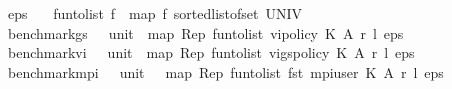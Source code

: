 \begin{isabellebody}
\isamarkupfalse%
\ {\isachardoublequoteopen}eps\ {\isacharequal}{\kern0pt}\ {}{\isachardot}{\kern0pt}{}{\isachardoublequoteclose}\isanewline
\isanewline
{}\isamarkupfalse%
\ {\isachardoublequoteopen}fun{\isacharunderscore}{\kern0pt}to{\isacharunderscore}{\kern0pt}list\ f\ {\isacharequal}{\kern0pt}\ map\ f\ {\isacharparenleft}{\kern0pt}sorted{\isacharunderscore}{\kern0pt}list{\isacharunderscore}{\kern0pt}of{\isacharunderscore}{\kern0pt}set\ UNIV{\isacharparenright}{\kern0pt}{\isachardoublequoteclose}\isanewline
{}\isamarkupfalse%
\ {\isachardoublequoteopen}benchmark{\isacharunderscore}{\kern0pt}gs\ {\isacharparenleft}{\kern0pt}{\isacharunderscore}{\kern0pt}\ {\isacharcolon}{\kern0pt}{\isacharcolon}{\kern0pt}\ unit{\isacharparenright}{\kern0pt}\ {\isacharequal}{\kern0pt}\ map\ Rep\ {\isacharparenleft}{\kern0pt}fun{\isacharunderscore}{\kern0pt}to{\isacharunderscore}{\kern0pt}list\ {\isacharparenleft}{\kern0pt}vi{\isacharunderscore}{\kern0pt}policy{\isacharprime}{\kern0pt}\ K\ A\ r\ l\ eps\ {}{\isacharparenright}{\kern0pt}{\isacharparenright}{\kern0pt}{\isachardoublequoteclose}\isanewline
{}\isamarkupfalse%
\ {\isachardoublequoteopen}benchmark{\isacharunderscore}{\kern0pt}vi\ {\isacharparenleft}{\kern0pt}{\isacharunderscore}{\kern0pt}\ {\isacharcolon}{\kern0pt}{\isacharcolon}{\kern0pt}\ unit{\isacharparenright}{\kern0pt}\ {\isacharequal}{\kern0pt}\ map\ Rep\ {\isacharparenleft}{\kern0pt}fun{\isacharunderscore}{\kern0pt}to{\isacharunderscore}{\kern0pt}list\ {\isacharparenleft}{\kern0pt}vi{\isacharunderscore}{\kern0pt}gs{\isacharunderscore}{\kern0pt}policy\ K\ A\ r\ l\ eps\ {}{\isacharparenright}{\kern0pt}{\isacharparenright}{\kern0pt}{\isachardoublequoteclose}\isanewline
{}\isamarkupfalse%
\ {\isachardoublequoteopen}benchmark{\isacharunderscore}{\kern0pt}mpi\ {\isacharparenleft}{\kern0pt}{\isacharunderscore}{\kern0pt}\ {\isacharcolon}{\kern0pt}{\isacharcolon}{\kern0pt}\ unit\ {\isacharparenright}{\kern0pt}\ {\isacharequal}{\kern0pt}\ map\ Rep\ {\isacharparenleft}{\kern0pt}fun{\isacharunderscore}{\kern0pt}to{\isacharunderscore}{\kern0pt}list\ {\isacharparenleft}{\kern0pt}fst\ {\isacharparenleft}{\kern0pt}mpi{\isacharunderscore}{\kern0pt}user\ K\ A\ r\ l\ eps\ {\isacharparenleft}{\kern0pt}{\isasymlambda}{\isacharunderscore}{\kern0pt}\ {\isacharunderscore}{\kern0pt}{\isachardot}{\kern0pt}\ {}{\isacharparenright}{\kern0pt}{\isacharparenright}{\kern0pt}{\isacharparenright}{\kern0pt}{\isacharparenright}{\kern0pt}{\isachardoublequoteclose}\isanewline

\end{isabellebody}
